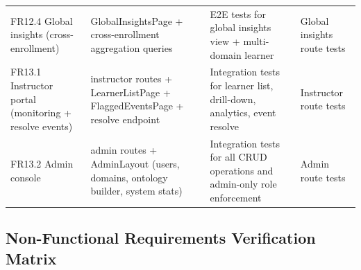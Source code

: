 \begin{longtable}{p{3cm}p{3.5cm}p{3cm}p{4.5cm}}
FR12.4 Global insights (cross-enrollment) & GlobalInsightsPage + cross-enrollment aggregation queries & E2E tests for global insights view + multi-domain learner & Global insights route tests \\
FR13.1 Instructor portal (monitoring + resolve events) & instructor routes + LearnerListPage + FlaggedEventsPage + resolve endpoint & Integration tests for learner list, drill-down, analytics, event resolve & Instructor route tests \\
FR13.2 Admin console & admin routes + AdminLayout (users, domains, ontology builder, system stats) & Integration tests for all CRUD operations and admin-only role enforcement & Admin route tests \\
\bottomrule
\end{longtable}

\subsection{Non-Functional Requirements Verification Matrix}

